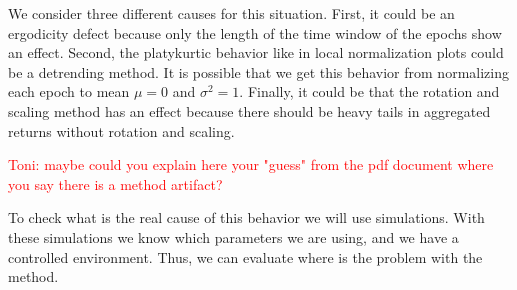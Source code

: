 We consider three different causes for this situation. First, it could be an
ergodicity defect because only the length of the time window of the epochs show
an effect. Second, the platykurtic behavior like in local normalization plots
\cite{local_normalization} could be a detrending method. It is possible that we
get this behavior from normalizing each epoch to mean
$\mu = 0$ and $\sigma^{2}=1$. Finally, it could be that the rotation and
scaling method has an effect because there should be heavy tails in aggregated
returns without rotation and scaling.

\textcolor{red}{Toni: maybe could you explain here your "guess" from the pdf
document where you say there is a method artifact?}

To check what is the real cause of this behavior we will use simulations.
With these simulations we know which parameters we are using, and we have a
controlled environment. Thus, we can evaluate where is the problem with the
method.